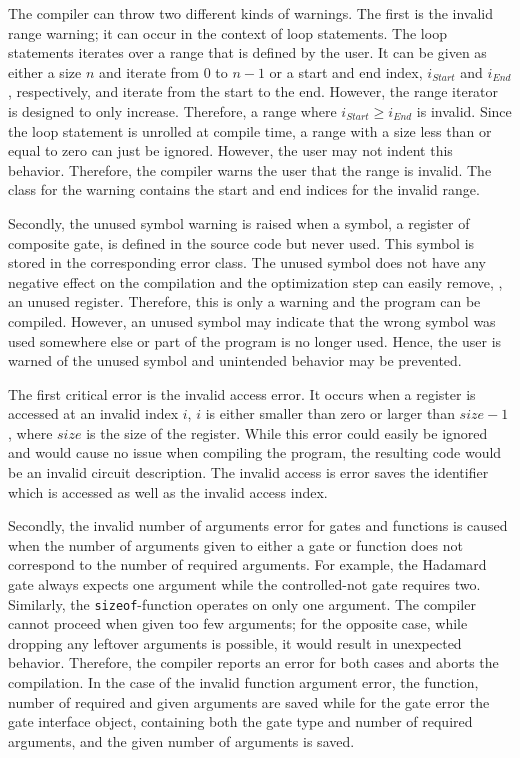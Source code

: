 The compiler can throw two different kinds of warnings. The first is the invalid range warning; it can occur in the context of loop statements. The loop statements iterates over a range that is defined by the user. It can be given as either a size $n$ and iterate from $0$ to $n-1$ or a start and end index, $i_{Start}$ and $i_{End}$, respectively, and iterate from the start to the end. However, the range iterator is designed to only increase. Therefore, a range where $i_{Start} \geq i_{End}$ is invalid. Since the loop statement is unrolled at compile time, a range with a size less than or equal to zero can just be ignored. However, the user may not indent this behavior. Therefore, the compiler warns the user that the range is invalid. The class for the warning contains the start and end indices for the invalid range.

Secondly, the unused symbol warning is raised when a symbol, \eg a register of composite gate, is defined in the source code but never used. This symbol is stored in the corresponding error class. The unused symbol does not have any negative effect on the compilation and the optimization step can easily remove, \eg, an unused register. Therefore, this is only a warning and the program can be compiled. However, an unused symbol may indicate that the wrong symbol was used somewhere else or part of the program is no longer used. Hence, the user is warned of the unused symbol and unintended behavior may be prevented. 

The first critical error is the invalid access error. It occurs when a register is accessed at an invalid index $i$, \ie $i$ is either smaller than zero or larger than $size - 1$, where $size$ is the size of the register. While this error could easily be ignored and would cause no issue when compiling the program, the resulting code would be an invalid circuit description. The invalid access is error saves the identifier which is accessed as well as the invalid access index. 

Secondly, the invalid number of arguments error for gates and functions is caused when the number of arguments given to either a gate or function does not correspond to the number of required arguments. For example, the Hadamard gate always expects one argument while the controlled-not gate requires two. Similarly, the \texttt{sizeof}-function operates on only one argument. The compiler cannot proceed when given too few arguments; for the opposite case, while dropping any leftover arguments is possible, it would result in unexpected behavior. %
Therefore, the compiler reports an error for both cases and aborts the compilation. In the case of the invalid function argument error, the function, number of required and given arguments are saved while for the gate error the gate interface object, containing both the gate type and number of required arguments, and the given number of arguments is saved. 

